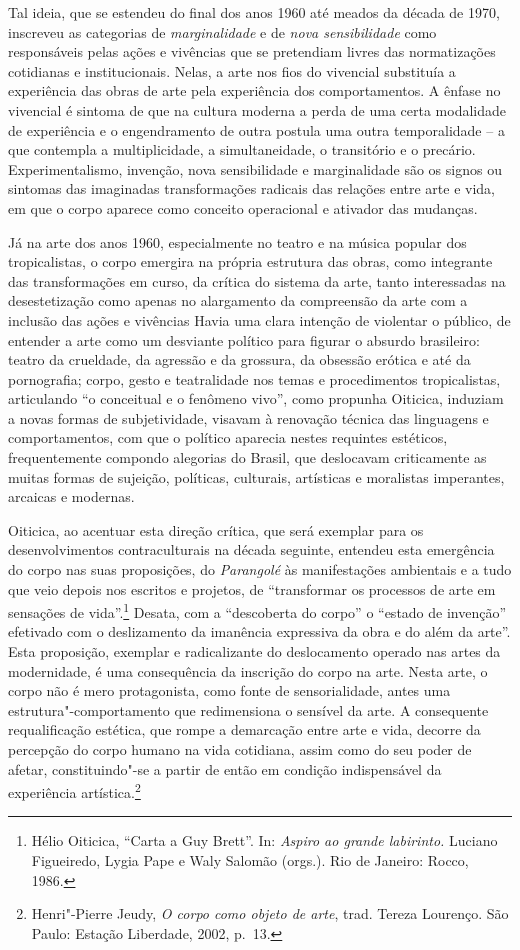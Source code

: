 Tal ideia, que se estendeu do final dos anos 1960 até meados da década
de 1970, inscreveu as categorias de \emph{marginalidade} e de \emph{nova
sensibilidade} como responsáveis pelas ações e vivências que se
pretendiam livres das normatizações cotidianas e institucionais. Nelas,
a arte nos fios do vivencial substituía a experiência das obras de arte
pela experiência dos comportamentos. A ênfase no vivencial é sintoma de
que na cultura moderna a perda de uma certa modalidade de experiência e
o engendramento de outra postula uma outra temporalidade -- a que
contempla a multiplicidade, a simultaneidade, o transitório e o
precário. Experimentalismo, invenção, nova sensibilidade e marginalidade
são os signos ou sintomas das imaginadas transformações radicais das
relações entre arte e vida, em que o corpo aparece como conceito
operacional e ativador das mudanças.

Já na arte dos anos 1960, especialmente no teatro e na música popular
dos tropicalistas, o corpo emergira na própria estrutura das obras, como
integrante das transformações em curso, da crítica do sistema da arte,
tanto interessadas na desestetização como apenas no alargamento da
compreensão da arte com a inclusão das ações e vivências Havia uma clara
intenção de violentar o público, de entender a arte como um desviante
político para figurar o absurdo brasileiro: teatro da crueldade, da
agressão e da grossura, da obsessão erótica e até da pornografia; corpo,
gesto e teatralidade nos temas e procedimentos tropicalistas,
articulando ``o conceitual e o fenômeno vivo'', como propunha Oiticica,
induziam a novas formas de subjetividade, visavam à renovação técnica
das linguagens e comportamentos, com que o político aparecia nestes
requintes estéticos, frequentemente compondo alegorias do Brasil, que
deslocavam criticamente as muitas formas de sujeição, políticas,
culturais, artísticas e moralistas imperantes, arcaicas e modernas.

Oiticica, ao acentuar esta direção crítica, que será exemplar para os
desenvolvimentos contraculturais na década seguinte, entendeu esta
emergência do corpo nas suas proposições, do \emph{Parangolé} às
manifestações ambientais e a tudo que veio depois nos escritos e
projetos, de ``transformar os processos de arte em sensações de
vida''.\footnote{Hélio Oiticica, ``Carta a Guy Brett''. In: \emph{Aspiro
  ao grande labirinto.} Luciano Figueiredo, Lygia Pape e Waly Salomão
  (orgs.). Rio de Janeiro: Rocco, 1986.} Desata, com a ``descoberta do
corpo'' o ``estado de invenção'' efetivado com o deslizamento da
imanência expressiva da obra e do além da arte''. Esta proposição,
exemplar e radicalizante do deslocamento operado nas artes da
modernidade, é uma consequência da inscrição do corpo na arte. Nesta
arte, o corpo não é mero protagonista, como fonte de sensorialidade,
antes uma estrutura"-comportamento que redimensiona o sensível da arte. A
consequente requalificação estética, que rompe a demarcação entre arte e
vida, decorre da percepção do corpo humano na vida cotidiana, assim como
do seu poder de afetar, constituindo"-se a partir de então em condição
indispensável da experiência artística.\footnote{Henri"-Pierre Jeudy,
  \emph{O corpo como objeto de arte}, trad. Tereza Lourenço. São Paulo:
  Estação Liberdade, 2002, p.~13.}

